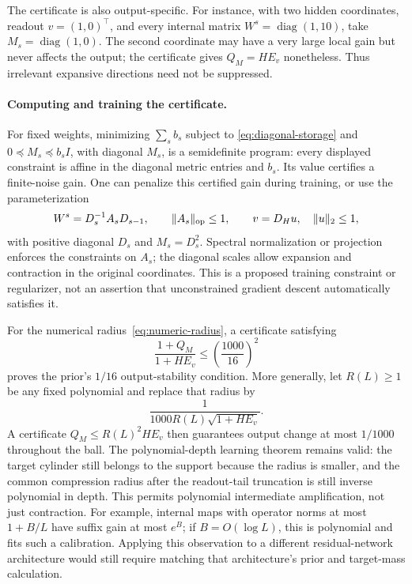 The certificate is also output-specific. For instance, with two hidden
coordinates, readout $v=(1,0)^\top$, and every internal matrix
$W^s=\operatorname{diag}(1,10)$, take
$M_s=\operatorname{diag}(1,0)$. The second coordinate may have a very large
local gain but never affects the output; the certificate gives
$Q_M=H E_v$ nonetheless. Thus irrelevant expansive directions need not
be suppressed.

\paragraph{Computing and training the certificate.}
For fixed weights, minimizing $\sum_s b_s$ subject to
\eqref{eq:diagonal-storage} and $0\preceq M_s\preceq b_sI$, with diagonal
$M_s$, is a semidefinite program: every displayed constraint is affine in
the diagonal metric entries and $b_s$. Its value certifies a finite-noise
gain. One can penalize this certified gain during training, or use the
parameterization
\[
 W^s=D_s^{-1}A_sD_{s-1},\qquad \|A_s\|_{\rm op}\le1,
 \qquad v=D_Hu,\quad\|u\|_2\le1,
\]
with positive diagonal $D_s$ and $M_s=D_s^2$.
Spectral normalization or projection enforces the constraints on $A_s$;
the diagonal scales allow expansion and contraction in the original
coordinates. This is a proposed training constraint or regularizer, not
an assertion that unconstrained gradient descent automatically satisfies it.

For the numerical radius~\eqref{eq:numeric-radius}, a certificate satisfying
\[
 \frac{1+Q_M}{1+H E_v}\le\left(\frac{1000}{16}\right)^2
\]
proves the prior's $1/16$ output-stability condition. More generally, let
$R(L)\ge1$ be any fixed polynomial and replace that radius by
\begin{equation}\label{eq:poly-transient-radius}
 \frac{1}{1000R(L)\sqrt{1+H E_v}}.
\end{equation}
A certificate $Q_M\le R(L)^2H E_v$ then guarantees output change at most
$1/1000$ throughout the ball. The polynomial-depth learning theorem remains
valid: the target cylinder still belongs to the support because the radius
is smaller, and the common compression radius after the readout-tail
truncation is still inverse polynomial in depth.
This permits polynomial intermediate amplification, not just contraction.
For example, internal maps with operator norms at most $1+B/L$ have suffix
gain at most $e^B$; if $B=O(\log L)$, this is polynomial and fits such a
calibration. Applying this observation to a different residual-network
architecture would still require matching that architecture's prior and
target-mass calculation.

